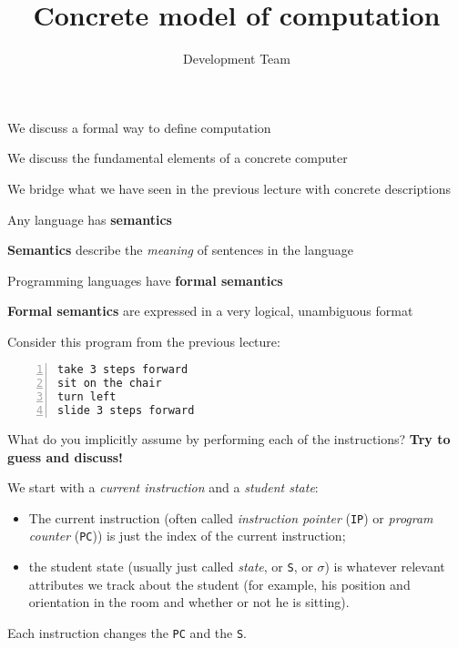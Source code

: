 \documentclass{beamer}
\title{Concrete model of computation}
\author{Development Team}
\institute{Hogeschool Rotterdam \\ 
Rotterdam, Netherlands}
\date{}
\begin{document}
\maketitle

\begin{slide}{
\item We discuss a formal way to define computation
\item We discuss the fundamental elements of a concrete computer
\item We bridge what we have seen in the previous lecture with concrete descriptions
}\end{slide}

\begin{slide}{
\item Any language has \textbf{semantics}
\item \textbf{Semantics} describe the \textit{meaning} of sentences in the language
\item Programming languages have \textbf{formal semantics}
\item \textbf{Formal semantics} are expressed in a very logical, unambiguous format
}\end{slide}

\begin{frame}[fragile]
Consider this program from the previous lecture:

\begin{lstlisting}[frame=shadowbox,numbers=left]
take 3 steps forward 
sit on the chair 
turn left 
slide 3 steps forward
\end{lstlisting}

What do you implicitly assume by performing each of the instructions? \textbf{Try to guess and discuss!}
\end{frame}

\begin{slide}{
\item We start with a \textit{current instruction} and a \textit{student state}:
\begin{itemize}
\item The current instruction (often called \textit{instruction pointer} (\texttt{IP}) or \textit{program counter} (\texttt{PC})) is just the index of the current instruction;
\item the student state (usually just called \textit{state}, or \texttt{S}, or $\sigma$) is whatever relevant attributes we track about the student (for example, his position and orientation in the room and whether or not he is sitting).
\end{itemize}
\item Each instruction changes the \texttt{PC} and the \texttt{S}.
}\end{slide}
\end{document}
